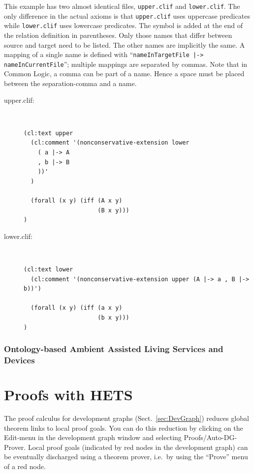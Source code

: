 \documentclass{article}
\newcommand{\normalTEXTSC}[2]{{#1\scriptsize#2}}
\newcommand     {\Hets}{\normalTEXTSC{H}{ETS}\xspace}
\begin{document}
This example has two almost identical files, \texttt{upper.clif} and 
\texttt{lower.clif}. The only difference in the actual axioms is that 
\texttt{upper.clif} uses uppercase predicates while \texttt{lower.clif} 
uses lowercase predicates. The symbol is added at the end of the relation
definition in parentheses. Only those names that differ between source
and target need to be listed. The other names are implicitly the same. 
A mapping of a single name is defined with 
``\texttt{nameInTargetFile |-> nameInCurrentFile}''; multiple mappings are 
separated by commas. Note that in Common Logic, a comma can be part of a name.
Hence a space must be placed between the separation-comma and a name.\\

\begin{description}
\item[upper.clif:]~\\
\begin{lstlisting}[language=clif]
(cl:text upper
  (cl:comment '(nonconservative-extension lower
    ( a |-> A
    , b |-> B
    ))'
  )
  
  (forall (x y) (iff (A x y)
                     (B x y)))
)
\end{lstlisting}
\item[lower.clif:]~\\
\begin{lstlisting}[language=clif]
(cl:text lower
  (cl:comment '(nonconservative-extension upper (A |-> a , B |-> b))')
  
  (forall (x y) (iff (a x y)
                     (b x y)))
)
\end{lstlisting}
\end{description}

\subsubsection{Ontology-based Ambient Assisted Living Services and Devices}
\label{sec:aal-example}



\section{Proofs with \Hets}\label{sec:Proofs}

The proof calculus for development graphs (Sect.~\ref{sec:DevGraph}) reduces
global theorem links to local proof goals. You can do this reduction by clicking 
on the Edit-menu in the development graph window and selecting 
Proofs/Auto-DG-Prover. Local proof goals (indicated by red
nodes in the development graph) can be eventually discharged using a theorem
prover, i.e.\ by using the ``Prove'' menu of a red node.
\end{document}
